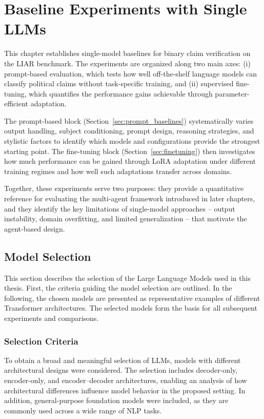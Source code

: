 \chapter{Baseline Experiments with Single LLMs}
\label{chap:baseline_single}

This chapter establishes single-model baselines for binary claim verification on the LIAR benchmark. The experiments are organized 
along two main axes: (i) prompt-based evaluation, which tests how well off-the-shelf language models can classify political claims 
without task-specific training, and (ii) supervised fine-tuning, which quantifies the performance gains achievable through parameter-efficient adaptation.

The prompt-based block (Section~\ref{sec:prompt_baselines}) systematically varies output handling, subject conditioning, prompt 
design, reasoning strategies, and stylistic factors to identify which models and configurations provide the strongest starting 
point. The fine-tuning block (Section~\ref{sec:finetuning}) then investigates how much performance can be gained through LoRA 
adaptation under different training regimes and how well such adaptations transfer across domains.

Together, these experiments serve two purposes: they provide a quantitative reference for evaluating the multi-agent framework 
introduced in later chapters, and they identify the key limitations of single-model approaches -- output instability, domain 
overfitting, and limited generalization -- that motivate the agent-based design.

\section{Model Selection}

This section describes the selection of the Large Language Models used in this thesis. First, the criteria guiding the model selection are outlined. In the following, the chosen models are presented as representative examples of different Transformer architectures. The selected models form the basis for all subsequent experiments and comparisons.

\subsection{Selection Criteria}

To obtain a broad and meaningful selection of LLMs, models with different architectural designs were considered. The selection includes decoder-only, encoder-only, and encoder--decoder architectures, enabling an analysis of how architectural differences influence model behavior in the proposed setting. In addition, general-purpose foundation models were included, as they are commonly used across a wide range of NLP tasks.


